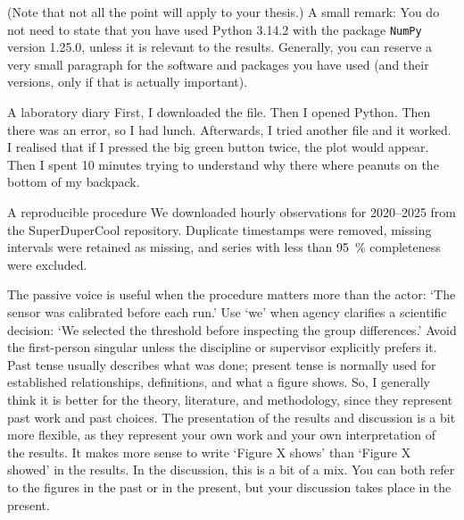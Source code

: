 \documentclass[masters,en,listoffigures,listoftables,acronyms]{NMBU}
\begin{document}
\noindent (Note that not all the point will apply to your thesis.)
A small remark: You do not need to state that you have used Python 3.14.2 with the package \texttt{NumPy} version 1.25.0, unless it is relevant to the results.
Generally, you can reserve a very small paragraph for the software and packages you have used (and their versions, only if that is actually important).

\begin{avoidbox}{A laboratory diary}
First, I downloaded the file.
Then I opened Python.
Then there was an error, so I had lunch.
Afterwards, I tried another file and it worked.
I realised that if I pressed the big green button twice, the plot would appear.
Then I spent 10 minutes trying to understand why there where peanuts on the bottom of my backpack.
\end{avoidbox}

\begin{betterbox}{A reproducible procedure}
We downloaded hourly observations for 2020--2025 from the SuperDuperCool repository.
Duplicate timestamps were removed, missing intervals were
retained as missing, and series with less than \qty{95}{\percent} completeness were excluded.
\end{betterbox}

The passive voice is useful when the procedure matters more than the actor:
`The sensor was calibrated before each run.'
Use `we' when agency clarifies a scientific decision: `We selected the threshold before inspecting the group differences.'
Avoid the first-person singular unless the discipline or supervisor explicitly prefers it.
Past tense usually describes what was done;
present tense is normally used for established relationships, definitions, and what a figure shows.
So, I generally think it is better for the theory, literature, and methodology, since they represent past work and past choices.
The presentation of the results and discussion is a bit more flexible, as they represent your own work and your own interpretation of the results.
It makes more sense to write `Figure X shows' than `Figure X showed' in the results.
In the discussion, this is a bit of a mix.
You can both refer to the figures in the past or in the present, but your discussion takes place in the present.
\end{document}
